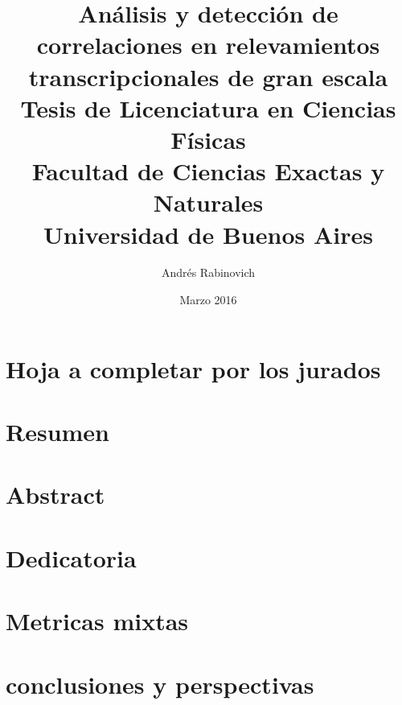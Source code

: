 \documentclass[12pt]{report}
\title{
	{\large Análisis y detección de correlaciones en relevamientos transcripcionales de gran escala}\\
    {Tesis de Licenciatura en Ciencias Físicas}\\
	{\large Facultad de Ciencias Exactas y Naturales}\\
	{\large Universidad de Buenos Aires}
}
\author{Andrés Rabinovich}
\date{Marzo 2016}
\newcommand{\paginaenblanco}{\clearpage\mbox{}\newpage}
\begin{document}
\maketitle
\paginaenblanco
\chapter*{Hoja a completar por los jurados}
\paginaenblanco
\chapter*{Resumen}
\paginaenblanco
\chapter*{Abstract}
\paginaenblanco
\chapter*{Dedicatoria}
\paginaenblanco

\tableofcontents






\chapter{Metricas mixtas}

\chapter{conclusiones y perspectivas}
\clearpage


\end{document}
